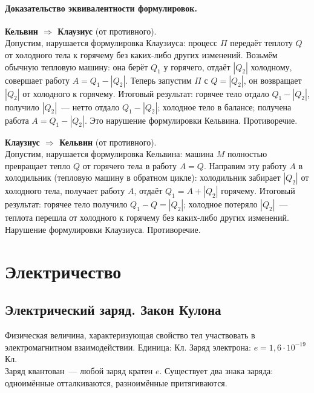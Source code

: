 \documentclass[12pt]{article}
\begin{document}
\paragraph{Доказательство эквивалентности формулировок.}

\textbf{Кельвин $\Rightarrow$ Клаузиус} (от противного).\\
Допустим, нарушается формулировка Клаузиуса: процесс $\Pi$ передаёт теплоту $Q$ от холодного тела к горячему без каких-либо других изменений. Возьмём обычную тепловую машину: она берёт $Q_1$ у горячего, отдаёт $|Q_2|$ холодному, совершает работу $A = Q_1 - |Q_2|$. Теперь запустим $\Pi$ с $Q = |Q_2|$, он возвращает $|Q_2|$ от холодного к горячему. Итоговый результат: горячее тело отдало $Q_1 - |Q_2|$, получило $|Q_2|$~--- нетто отдало $Q_1 - |Q_2|$; холодное тело в балансе; получена работа $A = Q_1 - |Q_2|$. Это нарушение формулировки Кельвина. Противоречие.

\textbf{Клаузиус $\Rightarrow$ Кельвин} (от противного).\\
Допустим, нарушается формулировка Кельвина: машина $M$ полностью превращает тепло $Q$ от горячего тела в работу $A = Q$. Направим эту работу $A$ в холодильник (тепловую машину в обратном цикле): холодильник забирает $|Q_2|$ от холодного тела, получает работу $A$, отдаёт $Q_1 = A + |Q_2|$ горячему. Итоговый результат: горячее тело получило $Q_1 - Q = |Q_2|$; холодное потеряло $|Q_2|$~--- теплота перешла от холодного к горячему без каких-либо других изменений. Нарушение формулировки Клаузиуса. Противоречие.

\newpage
\section{Электричество}

\subsection{Электрический заряд. Закон Кулона}

\begin{definition}
	Физическая величина, характеризующая свойство тел участвовать в электромагнитном взаимодействии. Единица: Кл. Заряд электрона: $e = 1{,}6 \cdot 10^{-19}$ Кл.\\
	Заряд квантован~--- любой заряд кратен $e$. Существует два знака заряда: одноимённые отталкиваются, разноимённые притягиваются.
\end{definition}
\end{document}
